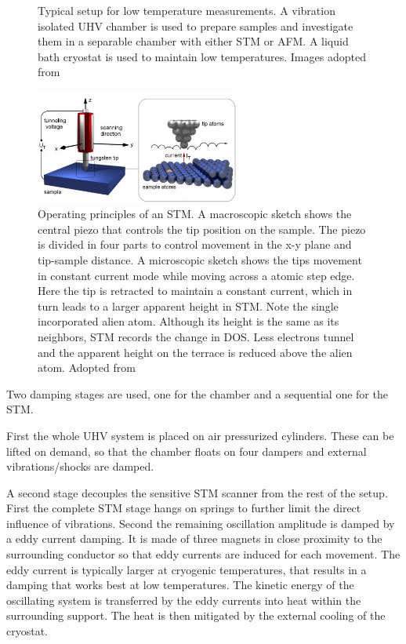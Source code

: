 \begin{figure}[ht]
{		\label{fig:STM-cryo}
	}
	\caption{Typical setup for low temperature measurements. A vibration isolated UHV chamber is used to prepare samples and investigate them in a separable chamber with either STM or AFM. A liquid bath cryostat is used to maintain low temperatures. Images adopted from \cite{diss-knud}}
	\label{fig:STM}
\end{figure}

\begin{figure}\centering
	
\includegraphics[width=0.6\textwidth]{./images/stm-rutgers-modified.jpg}
	\caption{Operating principles of an STM. A macroscopic sketch  shows the central piezo that controls the tip position on the sample. The piezo is divided in four parts to control movement in the x-y plane and tip-sample distance. A microscopic sketch shows the tips movement in constant current mode while moving across a atomic step edge. Here the tip is retracted to maintain a constant current, which in turn leads to a larger apparent height in STM. Note the single incorporated alien atom. Although its height is the same as its neighbors, STM records the change in DOS. Less electrons tunnel and the apparent height on the terrace is reduced above the alien atom. Adopted from \cite{STM-rutgers}}
\label{fig:STM-tip}
\end{figure}

Two damping stages are used, one for the chamber and a sequential one for the STM.

First the whole UHV system is placed on air pressurized cylinders. These can be lifted on demand, so that the chamber floats on four dampers and external vibrations/shocks are damped. 

A second stage decouples the sensitive STM scanner from the rest of the setup. First the complete STM stage hangs on springs to further limit the direct influence of vibrations. Second the remaining oscillation amplitude is damped by a eddy current damping. It is made of three magnets in close proximity to the surrounding conductor so that eddy currents are induced for each movement. The eddy current is typically larger at cryogenic temperatures, that results in a damping that works best at low temperatures. The kinetic energy of the oscillating system is transferred by the eddy currents into heat within the surrounding support. The heat is then mitigated by the external cooling of the cryostat.

